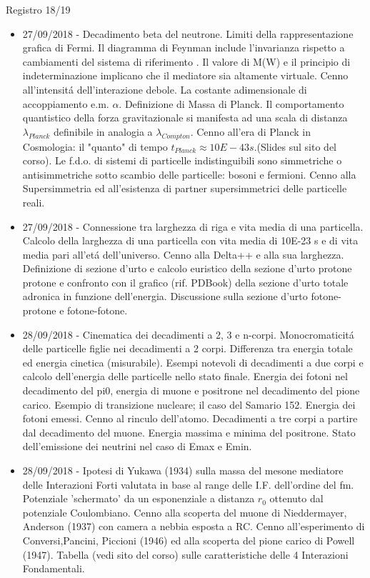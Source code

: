 \begin{frame}[allowframebreaks]{Registro 18/19}
\begin{itemize}
\item 27/09/2018 - Decadimento beta del neutrone. Limiti della rappresentazione grafica di Fermi. Il diagramma di Feynman include l'invarianza rispetto a cambiamenti del sistema di riferimento . Il valore di M(W) e il principio di indeterminazione implicano che il mediatore sia altamente virtuale. Cenno all'intensit\'a dell'interazione debole. La costante adimensionale di accoppiamento e.m. $\alpha$. Definizione di Massa di Planck. Il comportamento quantistico della forza gravitazionale si manifesta ad una scala di distanza $\lambda_{Planck}$ definibile in analogia a $\lambda_{Compton}$. Cenno all'era di Planck in Cosmologia: il "quanto" di tempo $t_{Planck}\approx10E-43 s$.(Slides sul sito del corso). Le f.d.o. di sistemi di particelle indistinguibili sono simmetriche o antisimmetriche sotto scambio delle particelle: bosoni e fermioni. Cenno alla Supersimmetria ed all'esistenza di partner supersimmetrici delle particelle reali.
\item 27/09/2018 - Connessione tra larghezza di riga e vita media di una particella. Calcolo della larghezza di una particella con vita media di 10E-23 s e di vita media pari all'et\'a dell'universo. Cenno alla Delta++ e alla sua larghezza. Definizione di sezione d'urto e calcolo euristico della sezione d'urto protone protone e confronto con il grafico (rif. PDBook) della sezione d’urto totale adronica in funzione dell’energia. Discussione sulla sezione d’urto fotone-protone e fotone-fotone.
\item 28/09/2018 - Cinematica dei decadimenti a 2, 3 e n-corpi. Monocromaticit\'a delle particelle figlie nei decadimenti a 2 corpi. Differenza tra energia totale ed energia cinetica (misurabile). Esempi notevoli di decadimenti a due corpi e calcolo dell'energia delle particelle nello stato finale. Energia dei fotoni nel decadimento del pi0, energia di muone e positrone nel decadimento del pione carico. Esempio di transizione nucleare; il caso del Samario 152. Energia dei fotoni emessi. Cenno al rinculo dell'atomo. Decadimenti a tre corpi a partire dal decadimento del muone. Energia massima e minima del positrone. Stato dell'emissione dei neutrini nel caso di Emax e Emin.
\item 28/09/2018 - Ipotesi di Yukawa (1934) sulla massa del mesone mediatore delle Interazioni Forti valutata in base al range delle I.F. dell'ordine del fm. Potenziale 'schermato' da un esponenziale a distanza $r_0$ ottenuto dal potenziale Coulombiano. Cenno alla scoperta del muone di Nieddermayer, Anderson (1937) con camera a nebbia esposta a RC. Cenno all'esperimento di Conversi,Pancini, Piccioni (1946) ed alla scoperta del pione carico di Powell (1947). Tabella (vedi sito del corso) sulle caratteristiche delle 4 Interazioni Fondamentali.

\end{itemize}
\end{frame}
